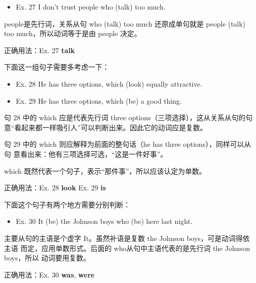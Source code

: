 \begin{mybox}

  \begin{itemize}
  \item   Ex. 27 I don't trust people who (talk) too much.
  \end{itemize}

  people是先行词，关系从句 who (talk) too much 还原成单句就是 people (talk) too
  much，所以动词等于是由 people 决定。

  \tcblower

  正确用法：Ex. 27 \textbf{talk}
\end{mybox}

下面这一组句子需要多考虑一下：
\begin{mybox}

  \begin{itemize}
  \item   Ex. 28 He has three options, which (look) equally attractive.
  \item   Ex. 29 He has three options, which (be) a good thing.
  \end{itemize}

  句 28 中的 which 应是代表先行词 three options（三项选择），这从关系从句的句
  意“看起来都一样吸引人”可以判断出来。因此它的动词应是复数。

  句 29 中的 which 则应解释为前面的整句话（he has three options），同样可以从句
  意看出来：他有三项选择可选，“这是一件好事”。

  which 既然代表一个句子，表示“那件事”，所以应该认定为单数。

  \tcblower

  正确用法：Ex. 28 \textbf{look} \qquad\quad Ex. 29 \textbf{is}
\end{mybox}

下面这个句子有两个地方需要分别判断：

\begin{mybox}

  \begin{itemize}
  \item   Ex. 30 It (be) the Johnson boys who (be) here last night.
  \end{itemize}

  主要从句的主语是个虚字 It。虽然补语是复数 the Johnson boys，可是动词得依主语
  而定，应用单数形式。后面的 who从句中主语代表的是先行词 the Johnson boys，所以
  动词要用复数。

  \tcblower

  正确用法：Ex. 30 \textbf{was}, \textbf{were}
\end{mybox}

